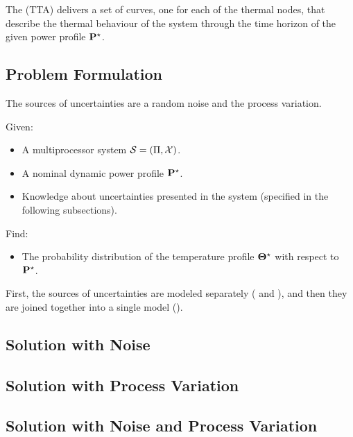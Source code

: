 The  (TTA) delivers a set of curves, one for each of the thermal nodes, that describe the thermal behaviour of the system through the time horizon of the given power profile $\mathbf{P}^\star$.

\subsection{Problem Formulation}
The sources of uncertainties are a random noise and the process variation.

Given:
\begin{itemize}
  \item A multiprocessor system $\mathcal{S} = (\Pi, \mathcal{X})$.
  \item A nominal dynamic power profile $\mathbf{P}^\star$.
  \item Knowledge about uncertainties presented in the system (specified in the following subsections).
\end{itemize}

Find:
\begin{itemize}
  \item The probability distribution of the temperature profile $\mathbf{\Theta}^\star$ with respect to $\mathbf{P}^\star$.
\end{itemize}

First, the sources of uncertainties are modeled separately ( and ), and then they are joined together into a single model ().

\subsection{Solution with Noise} 


\subsection{Solution with Process Variation} 


\subsection{Solution with Noise and Process Variation} 

